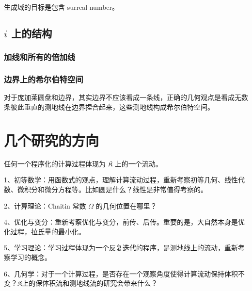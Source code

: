 \documentclass[a4paper,12pt]{article}
\begin{document}
生成域的目标是包含 surreal number。

\subsection{$i$ 上的结构}

\subsubsection{加线和所有的倍加线}

\subsubsection{边界上的希尔伯特空间}

对于庞加莱圆盘和边界，其实边界不应该看成一条线，正确的几何观点是看成无数条彼此垂直的测地线在边界捏合起来，这些测地线构成希尔伯特空间。

\newpage

\section{几个研究的方向}

任何一个程序化的计算过程体现为 $\mathfrak{K}$ 上的一个流动。

1、初等数学：用函数式的观点，理解计算流动过程，重新考察初等几何、线性代数、微积分和微分方程等。比如圆是什么？线性是非常值得考察的。

2、计算理论：Chaitin 常数 $\Omega$ 的几何位置在哪里？

4、优化与变分：重新考察优化与变分，前传、后传。重要的是，大自然本身是优化过程，拉氏量的最小化。

5、学习理论：学习过程体现为一个反复迭代的程序，是测地线上的流动，重新考察学习的概念。

6、几何学：对于一个计算过程，是否存在一个观察角度使得计算流动保持体积不变？$\mathfrak{K}$上的保体积流和测地线流的研究会带来什么？
\end{document}
